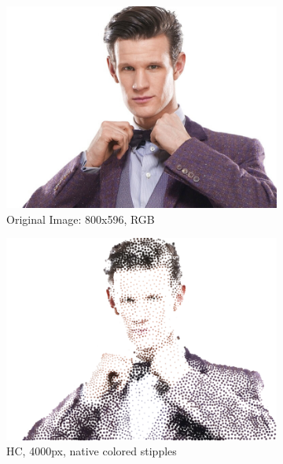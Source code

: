 \documentclass[11pt]{article}
\begin{document}
\begin{figure}[H]
	\centering
	\begin{subfigure}[b]{0.84\linewidth}
		\includegraphics[width=\linewidth]{pix/bowtie.png}
		\caption{Original Image: 800x596, RGB}
	\end{subfigure}
	\begin{subfigure}[b]{0.4\linewidth}
		\includegraphics[width=\linewidth]{pix/hc_bowtie-4000.png}
		\caption{HC, 4000px, native colored stipples}
	\end{subfigure}
	\begin{subfigure}[b]{0.4\linewidth}

\end{subfigure}
\end{figure}
\end{document}
